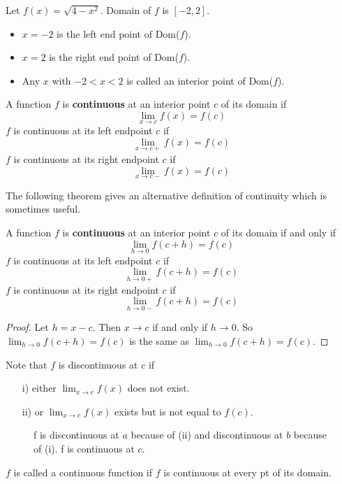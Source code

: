 \documentclass[calc1-main.tex]{subfiles}
\begin{document}
	Let $f(x) = \sqrt{4 - x^2}$. Domain of $f$ is $[-2, 2]$.
	\begin{itemize}
		\item $x = -2$ is the left end point of Dom($f$).
		\item $x = 2$ is the right end point of Dom($f$).
		\item Any $x$ with $-2 < x < 2$ is called an interior point of Dom($f$).
	\end{itemize}

	\begin{definition}
		A function $f$ is \textbf{continuous} at an interior point $c$ of its domain if
		\[
			\lim_{x \to c} f(x) = f(c)
		\]
		$f$ is continuous at its left endpoint $c$ if
		\[
			\lim_{x \to c+} f(x) = f(c)
		\]
		$f$ is continuous at its right endpoint $c$ if
		\[
			\lim_{x \to c-} f(x) = f(c)
		\]
	\end{definition}

	The following theorem gives an alternative definition of continuity which is sometimes useful.
	\begin{theorem}\label{alternative continuity}
	A function $f$ is \textbf{continuous} at an interior point $c$ of its domain if and only if
	\[
		\lim_{h \to 0} f(c+h) = f(c)
	\]
	$f$ is continuous at its left endpoint $c$ if
	\[
		\lim_{h \to 0+} f(c+h) = f(c)
	\]
	$f$ is continuous at its right endpoint $c$ if
	\[
		\lim_{h \to 0-} f(c+h) = f(c)
	\]
\end{theorem}
\begin{proof}
	Let $h=x-c$. Then $x \to c$ if and only if $h \to 0$. So $\lim_{h \to 0} f(c+h) = f(c)$ is the same as $\lim_{h \to 0} f(c+h) = f(c)$.
\end{proof}
Note that $f$ is discontinuous at $c$ if
\begin{itemize}
	\item[i)] either $\lim_{x \to c} f(x)$ does not exist.
	\item[ii)] or $\lim_{x \to c} f(x)$ exists but is not equal to $f(c)$.
\end{itemize}

\begin{figure}[H]
	\centering
	
	\caption{f is discontinuous at $a$ because of (ii) and discontinuous at $b$ because of (i). f is continuous at $c$.}
\end{figure}

\begin{definition}
	$f$ is called a continuous function if $f$ is continuous at every pt of its domain.
\end{definition}
\end{document}

